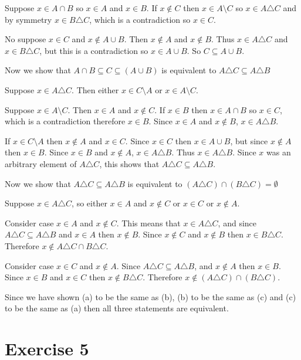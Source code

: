 \documentclass[11pt]{article}
\begin{document}
Suppose $x \in A \cap B$ so $x \in A$ and $x \in B$. If $x \notin C$ then 
$x \in A \setminus C$ so $x \in A \triangle C$ and by symmetry $x \in B \triangle C$,
which is a contradiction so $x \in C$.

No suppose $x \in C$ and $x \notin A \cup B$. Then $x \notin A$ and $x \notin B$.
Thus $x \in A \triangle C$ and $x \in B \triangle C$, but this is a contradiction 
so $x \in A \cup B$. So $C \subseteq A \cup B$.

Now we show that $A \cap B \subseteq C \subseteq (A \cup B)$ is equivalent to 
$A \triangle C \subseteq A \triangle B$

Suppose $x \in A \triangle C$. Then either $x \in C \setminus A$ or 
$x \in A \setminus C$.

Suppose $x \in A \setminus C$. Then $x \in A$ and $x \notin C$. If $x \in B$
then $x \in A \cap B$ so $x \in C$, which is a contradiction therefore $x \in B$.
Since $x \in A$ and $x \notin B$, $x \in A \triangle B$.

If $x \in C \setminus A$ then $x \notin A$ and $x \in C$. Since $x \in C$ then 
$x \in A \cup B$, but since $x \notin A$ then $x \in B$. Since $x \in B$ and
$x \notin A$, $x \in A \triangle B$. Thus $x \in A \triangle B$. Since $x$ was 
an arbitrary element of $A \triangle C$, this shows that 
$A \triangle C \subseteq A \triangle B$.

Now we show that $A \triangle C \subseteq A \triangle B$ is equivalent to 
$(A \triangle C) \cap (B \triangle C) = \emptyset$

Suppose $x \in A \triangle C$, so either $x \in A$ and $x \notin C$ or $x \in C$
or $x \notin A$.

Consider case $x \in A$ and $x \notin C$. This means that $x \in A \triangle C$,
and since $A \triangle C \subseteq A \triangle B$ and $x \in A$ then $x \notin B$.
Since $x \notin C$ and $x \notin B$ then $x \in B \triangle C$. Therefore 
$x \notin A \triangle C \cap B \triangle C$.

Consider case $x \in C$ and $x \notin A$. Since 
$A \triangle C \subseteq A \triangle B$, and $x \notin A$ then $x \in B$.
Since $x \in B$ and $x \in C$ then $x \notin B \triangle C$. Therefore 
$x \notin (A \triangle C)  \cap (B \triangle C)$.

Since we have shown (a) to be the same as (b), (b) to be the same as (c) and 
(c) to be the same as (a) then all three statements are equivalent.

\section*{Exercise 5}
\end{document}
